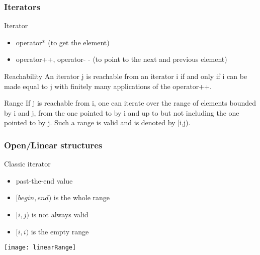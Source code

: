 \begin{frame}
  \frametitle{Iterators}

  \begin{block}{Iterator}
    \begin{itemize}
    \item operator* (to get the element)
    \item operator++, operator- - (to point to the next and previous element)
    \end{itemize}
  \end{block}

  \begin{block}{Reachability}
An iterator j is reachable from an iterator i if and only if i can be made equal to j with finitely many applications of the operator++. 
  \end{block}

  \begin{block}{Range}
If j is reachable from i, one can iterate over the range of elements bounded by i and j, from the one pointed to by i and up to but not including the one pointed to by j. Such a range is valid and is denoted by [i,j).
  \end{block}

\end{frame}

\begin{frame}
  \frametitle{Open/Linear structures}

  \begin{block}{Classic iterator}
\begin{itemize}
  \item past-the-end value
  \item $[begin,end)$ is the whole range
  \item $[i,j)$ is not always valid
  \item $[i,i)$ is the empty range
\end{itemize}
  \end{block}

 \begin{center}
   \texttt{[image: linearRange]}
 \end{center}

\end{frame}

